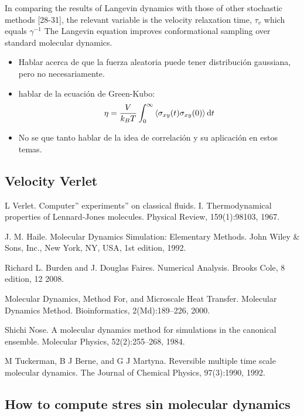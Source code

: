 In comparing the results of Langevin dynamics with those of other stochastic methods [28-31], the relevant variable is the velocity relaxation time, $\tau_{v}$ which equals $\gamma^{-1}$\citep{pastorTechniquesApplicationsLangevin1994}
The Langevin equation improves conformational sampling over standard molecular dynamics\citep{paquetMolecularDynamicsMonte2015}.

\begin{itemize}
    \item Hablar acerca de que la fuerza aleatoria puede tener distribución gaussiana, pero no necesariamente.
    \item hablar de la ecuación de Green-Kubo: \[\eta=\frac{V}{k_B T}\int_{0}^{\infty}\expval{\sigma_{xy}(t)\sigma_{xy}(0)}\mathrm{d}t\]
    \item No se que tanto hablar de la idea de correlación y su aplicación en estos temas.
\end{itemize}

\subsection{Velocity Verlet}

L Verlet. Computer” experiments” on classical fluids. I. Thermodynamical properties of Lennard-Jones molecules. Physical Review, 159(1):98103, 1967.

J. M. Haile. Molecular Dynamics Simulation: Elementary Methods.  John Wiley \& Sons, Inc., New York, NY, USA, 1st edition, 1992.

Richard L. Burden and J. Douglas Faires. Numerical Analysis. Brooks  Cole, 8 edition, 12 2008.

Molecular Dynamics, Method For, and Microscale Heat Transfer. Molecular Dynamics Method. Bioinformatics, 2(Md):189–226, 2000.

Shichi Nose. A molecular dynamics method for simulations in the canonical ensemble. Molecular Physics, 52(2):255–268, 1984.

M Tuckerman, B J Berne, and G J Martyna. Reversible multiple time  scale molecular dynamics. The Journal of Chemical Physics, 97(3):1990,  1992.

\subsection{How to compute stres sin molecular dynamics}


